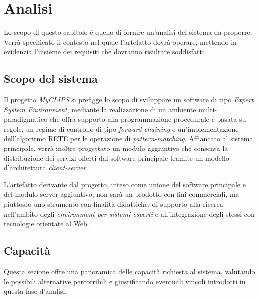 
\chapter{Analisi}

Lo scopo di questo capitolo è quello di fornire un'analisi del sistema da proporre. Verrà specificato il contesto nel quale l'artefatto dovrà operare, mettendo in evidenzia l'insieme dei requisiti che dovranno risultare soddisfatti. 

\section{Scopo del sistema}

Il progetto \emph{MyCLIPS} si prefigge lo scopo di sviluppare un software di tipo \emph{Expert System Environment}, mediante la realizzazione di un ambiente multi-paradigmatico che offra supporto alla programmazione procedurale e basata su regole, un regime di controllo di tipo \emph{forward chaining} e un'implementazione dell'algoritmo RETE per le operazione di \emph{pattern-matching}.
Affiancato al sistema principale, verrà inoltre progettato un modulo aggiuntivo che consenta la distribuzione dei servizi offerti dal software principale tramite un modello d'architettura \emph{client-server}.

L'artefatto derivante dal progetto, inteso come unione del software principale e del modulo server aggiuntivo, non sarà un prodotto con fini commerciali, ma piuttosto uno strumento con finalità didattiche, di supporto alla ricerca nell'ambito degli \emph{environment per sistemi esperti} e all'integrazione degli stessi con tecnologie orientate al Web.


%


%

\section{Capacità}

Questa sezione offre una panoramica delle capacità richiesta al sistema, valutando le possibili alternative percorribili e giustificando eventuali vincoli introdotti in questa fase d'analisi.

